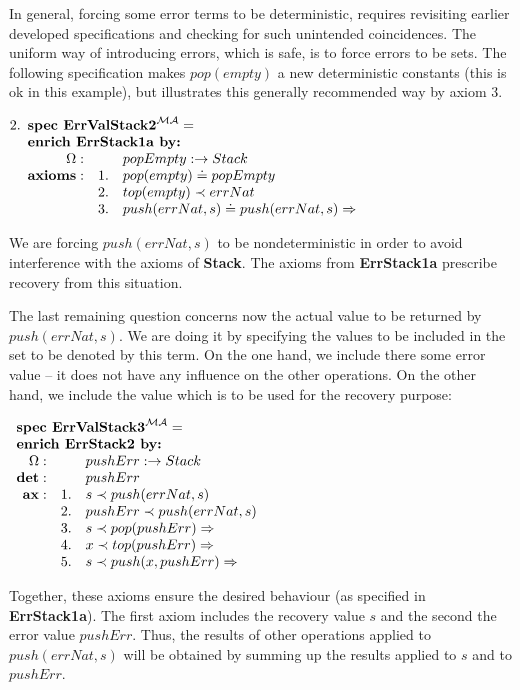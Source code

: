 \documentclass[10pt]{article}
\begin{document}
In general, forcing some error terms to be deterministic, requires revisiting
earlier developed specifications and checking for such unintended
coincidences. The uniform way of introducing errors, which is safe, is to
force errors to be sets. The following specification makes $pop(empty)$ a new
deterministic constants (this is ok in this example), but illustrates this
generally recommended way by axiom 3.
\vspace*{1ex}

\(
2. \spec{	\tit{\mbox{\bf spec\ ErrValStack2}^{\inst{MA}}=} \\
	\tit{\mbox{\bf enrich\ ErrStack1a\  by:}} \\
	    	\Ops:	&& popEmpty: \to Stack\\
	 	{\bf axioms:}
			&1.& pop(empty) \eleq popEmpty \\
			&2.& top(empty) \prec errNat \\
			&3.& push(errNat,s)\eleq push(errNat,s) \To
}
\)

\noindent
We are forcing $push(errNat,s)$ to be nondeterministic in order to avoid interference
with the axioms of {\bf Stack}. The axioms from {\bf ErrStack1a} prescribe
recovery from this situation.

The last remaining question concerns now the actual value to be returned by
$push(errNat,s)$. We are doing it by specifying the values to be included in
the set to be denoted by this term. On the one hand, we include there some
error value -- it does not have any influence on the other operations. On the
other hand, we include the value which is to be used for the recovery
purpose:

\(
 \spec{	\tit{\mbox{\bf spec\ ErrValStack3}^{\inst{MA}}=} \\
	\tit{\mbox{\bf enrich\ ErrStack2\  by:}} \\
	    	\Ops:	&& pushErr: \to Stack\\
		{\bf det:} && pushErr \\
	 	{\bf ax:}
			&1.& s\prec push(errNat,s) \\
			&2.& pushErr\prec push(errNat,s) \\
			&3.& s\prec pop(pushErr) \To \\
			&4.& x\prec top(pushErr) \To \\
			&5.& s\prec push(x,pushErr) \To
}
\)

\noindent
Together, these axioms ensure the desired behaviour (as specified in {\bf
ErrStack1a}). The first axiom includes the recovery value $s$ and the second
the error value $pushErr$. Thus, the results of other operations applied to
$push(errNat,s)$ will be obtained by summing up the results applied to $s$ and
to $pushErr$. 
\end{document}
